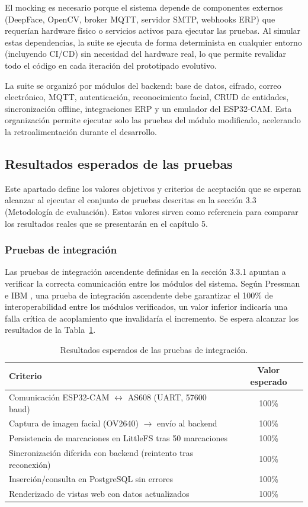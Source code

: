 \documentclass{iccmemoria}
\begin{document}
El mocking es necesario porque el sistema depende de componentes externos (DeepFace, OpenCV, broker MQTT, servidor SMTP, webhooks ERP) que requerían hardware físico o servicios activos para ejecutar las pruebas. Al simular estas dependencias, la suite se ejecuta de forma determinista en cualquier entorno (incluyendo CI/CD) sin necesidad del hardware real, lo que permite revalidar todo el código en cada iteración del prototipado evolutivo.

La suite se organizó por módulos del backend: base de datos, cifrado, correo electrónico, MQTT, autenticación, reconocimiento facial, CRUD de entidades, sincronización offline, integraciones ERP y un emulador del ESP32-CAM. Esta organización permite ejecutar solo las pruebas del módulo modificado, acelerando la retroalimentación durante el desarrollo.

\subsection{Resultados esperados de las pruebas}
Este apartado define los valores objetivos y criterios de aceptación que se esperan alcanzar al ejecutar el conjunto de pruebas descritas en la sección 3.3 (Metodología de evaluación). Estos valores sirven como referencia para comparar los resultados reales que se presentarán en el capítulo 5.

\subsubsection{Pruebas de integración}
Las pruebas de integración ascendente definidas en la sección 3.3.1 apuntan a verificar la correcta comunicación entre los módulos del sistema. Según Pressman \cite{pressman2021} e IBM \cite{ibm_integrationtesting}, una prueba de integración ascendente debe garantizar el 100\% de interoperabilidad entre los módulos verificados, un valor inferior indicaría una falla crítica de acoplamiento que invalidaría el incremento. Se espera alcanzar los resultados de la Tabla~\ref{tab:esperado_integracion}.

\begin{table}[H]
\centering
\small
\begin{tabular}{|p{8cm}|c|}
\hline
\textbf{Criterio} & \textbf{Valor esperado} \\
\hline
Comunicación ESP32-CAM $\leftrightarrow$ AS608 (UART, 57600 baud) & 100\% \\
Captura de imagen facial (OV2640) $\rightarrow$ envío al backend & 100\% \\
Persistencia de marcaciones en LittleFS tras 50 marcaciones & 100\% \\
Sincronización diferida con backend (reintento tras reconexión) & 100\% \\
Inserción/consulta en PostgreSQL sin errores & 100\% \\
Renderizado de vistas web con datos actualizados & 100\% \\
\hline
\end{tabular}
\caption{Resultados esperados de las pruebas de integración.}
\label{tab:esperado_integracion}
\end{table}
\end{document}
